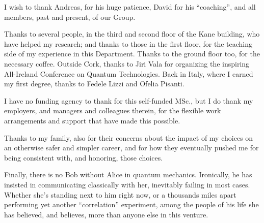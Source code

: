 I wish to thank Andreas, for his huge patience, David for
his ``coaching'',
and all members, past and present, of our Group.

Thanks to several people, in the third and second floor of the Kane building,
who have helped my research; and thanks to those in the first floor,
for the teaching side of my experience in this Department.
Thanks to the ground floor too, for the necessary coffee.
Outside Cork, thanks to Jiri Vala
for organizing the inspiring All-Ireland Conference on Quantum Technologies.
Back in Italy, where I earned my first degree, thanks to Fedele Lizzi and Ofelia Pisanti.

I have no funding agency to thank for this self-funded MSc.,
but I do thank my employers, and managers and colleagues therein,
for the flexible work arrangements and support that have made this possible.

Thanks to my family, also for their concerns about the impact of my choices on an otherwise safer and simpler career,
and for how they eventually pushed me for being consistent with, and honoring, those choices.

Finally, there is no Bob without Alice in quantum mechanics.
Ironically, he has insisted in communicating classically with her,
inevitably failing in most cases.
Whether she's standing next to him right now,
or a thousands miles apart performing yet another ``correlation'' experiment,
among the people of his life
she has believed, and believes, more than anyone else in this venture.